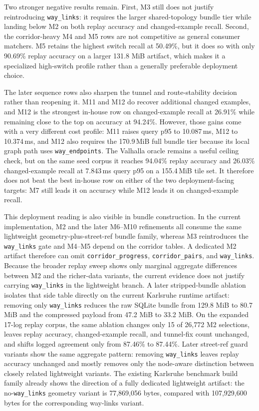 \documentclass{article}
\begin{document}
Two stronger negative results remain. First, M3 still does not justify reintroducing \texttt{way\_links}: it requires the larger shared-topology bundle tier while landing below M2 on both replay accuracy and changed-example recall. Second, the corridor-heavy M4 and M5 rows are not competitive as general consumer matchers. M5 retains the highest switch recall at 50.49\%, but it does so with only 90.69\% replay accuracy on a larger 131.8 MiB artifact, which makes it a specialized high-switch profile rather than a generally preferable deployment choice.

The later sequence rows also sharpen the tunnel and route-stability decision rather than reopening it. M11 and M12 do recover additional changed examples, and M12 is the strongest in-house row on changed-example recall at 26.91\% while remaining close to the top on accuracy at 94.24\%. However, those gains come with a very different cost profile: M11 raises query p95 to 10.087\,ms, M12 to 10.374\,ms, and M12 also requires the 170.9\,MiB full bundle tier because its local graph path uses \texttt{way\_endpoints}. The Valhalla oracle remains a useful ceiling check, but on the same seed corpus it reaches 94.04\% replay accuracy and 26.03\% changed-example recall at 7.843\,ms query p95 on a 155.4\,MiB tile set. It therefore does not beat the best in-house row on either of the two deployment-facing targets: M7 still leads it on accuracy while M12 leads it on changed-example recall.

This deployment reading is also visible in bundle construction. In the current implementation, M2 and the later M6--M10 refinements all consume the same lightweight geometry-plus-street-ref bundle family, whereas M3 reintroduces the \texttt{way\_links} gate and M4--M5 depend on the corridor tables. A dedicated M2 artifact therefore can omit \texttt{corridor\_progress}, \texttt{corridor\_pairs}, and \texttt{way\_links}. Because the broader replay sweep shows only marginal aggregate differences between M2 and the richer-data variants, the current evidence does not justify carrying \texttt{way\_links} in the lightweight branch. A later stripped-bundle ablation isolates that side table directly on the current Karlsruhe runtime artifact: removing only \texttt{way\_links} reduces the raw SQLite bundle from 129.8 MiB to 80.7 MiB and the compressed payload from 47.2 MiB to 33.2 MiB. On the expanded 17-log replay corpus, the same ablation changes only 15 of 26{,}772 M2 selections, leaves replay accuracy, changed-example recall, and tunnel-fix count unchanged, and shifts logged agreement only from 87.46\% to 87.44\%. Later street-ref guard variants show the same aggregate pattern: removing \texttt{way\_links} leaves replay accuracy unchanged and mostly removes only the node-aware distinction between closely related lightweight variants. The existing Karlsruhe benchmark build family already shows the direction of a fully dedicated lightweight artifact: the no-\texttt{way\_links} geometry variant is 77{,}869{,}056 bytes, compared with 107{,}929{,}600 bytes for the corresponding way-links variant.
\end{document}
